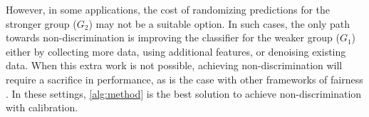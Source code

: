 However, in some applications, the cost of randomizing predictions for the
stronger group ($G_2$) may not be a suitable option. In such cases, the only path towards
non-discrimination is improving the classifier for the weaker group ($G_1$)
either by collecting more data, using additional features, or denoising existing
data. When this extra work is not possible, achieving non-discrimination will
require a sacrifice in performance, as is the case with other frameworks
of fairness
\cite{berk2017fairness,corbett2017algorithmic,hardt2016equality,zliobaite2015relation}.
In these settings, \autoref{alg:method} is
the best solution to achieve non-discrimination with calibration.

